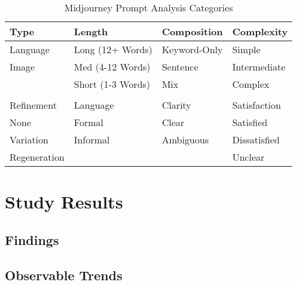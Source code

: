 \begin{table}[]
    \centering
    \caption{Midjourney Prompt Analysis Categories}
    \begin{tabular}{@{}llll@{}}
        \toprule
        Type & Length & Composition & Complexity \\ \midrule
        Language & Long (12+ Words) & Keyword-Only & Simple \\
        Image & Med (4-12 Words) & Sentence & Intermediate \\
        & Short (1-3 Words) & Mix & Complex \\
        \\
        \toprule
        Refinement & Language & Clarity & Satisfaction \\
        \midrule
        None & Formal & Clear & Satisfied \\
        Variation & Informal & Ambiguous & Dissatisfied \\
        Regeneration & & & Unclear \\
        \bottomrule
    \end{tabular}
    \label{tab:table2}
\end{table}

\section{Study Results}
\label{sec:study-results}

\subsection{Findings}
\label{subsec:findings}

\subsection{Observable Trends}
\label{subsec:observable-trends}


